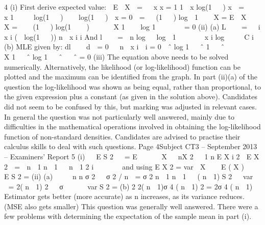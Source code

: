 4
(i)
First derive expected value:

E  X  =   x
x  =  1
1
 x
log(1   ) x

=


 x
1

   log(1   )    log(1   )

x  =  0 
= 

(1   ) log  1   
X  =  E  X   X  =  
 
(1   ) log(1    )

 

 X 1  
 log 1        =  0
(ii)
(a)
L     = 
  i
x i
(  log(1   )) n  x i
i
And l     =   n log   log  1       x i log     C
i
(b)
MLE given by:
dl   
d 
= 0 

n
 x i
 i = 0
 ˆ
log 1   ˆ 1   ˆ

 



 X 1   ˆ log 1   ˆ   ˆ  =  0
(iii)
The equation above needs to be solved numerically. Alternatively, the
likelihood (or log-likelihood) function can be plotted and the maximum can be
identified from the graph.
In part (ii)(a) of the question the log-likelihood was shown as being equal, rather than
proportional, to the given expression plus a constant (as given in the solution above).
Candidates did not seem to be confused by this, but marking was adjusted in relevant cases.
In general the question was not particularly well answered, mainly due to difficulties in the
mathematical operations involved in obtaining the log-likelihood function of non-standard
densities. Candidates are advised to practise their calculus skills to deal with such questions.
Page 4Subject CT3 – September 2013 – Examiners’ Report
5
(i)
 
E S
2


 =  E 
 
  X

 nX 2  
1
n
E X i 2 
E X 2
  = 

n  1
n  1
  n  1
2
i
 
 
 
and using E X 2  =  var  X    E ( X ) 
 
E S 2  = 
(ii)
(a)




n
n
σ 2   
σ 2 / n    =  σ 2
n  1
n  1
  ( n  1) S 2  
var 
  =  2( n  1)
2
  σ
 
 
 var S 2  = 
(b)
2
2( n  1)σ 4
( n  1) 2
 = 
2σ 4
( n  1)
Estimator gets better (more accurate) as n increases, as its variance
reduces.
(MSE also gets smaller)
This question was generally well answered. There were a few problems with determining the
expectation of the sample mean in part (i).
